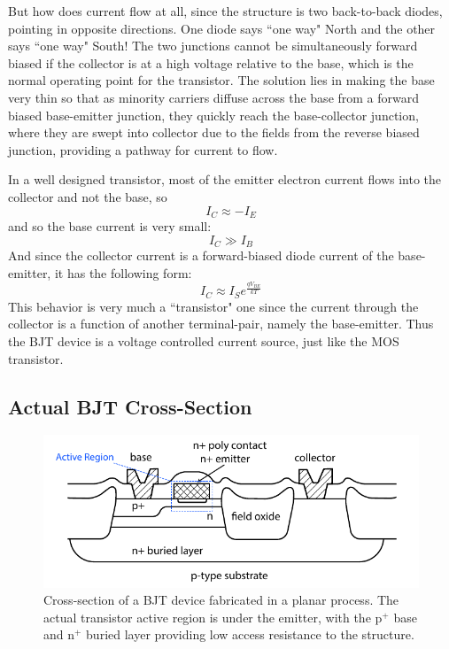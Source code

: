 But how does current flow at all, since the structure is two back-to-back diodes, pointing in opposite directions.  One diode says ``one way" North and the other says ``one way" South!  The two junctions cannot be simultaneously forward biased if the collector is at a high voltage relative to the base, which is the normal operating point for the transistor.  The solution lies in making the base very thin so that as minority carriers diffuse across the base from a forward biased base-emitter junction, they quickly reach the base-collector junction, where they are swept into collector due to the fields from the reverse biased junction, providing a pathway for current to flow.  

In a well designed transistor, most of the emitter electron current flows into the collector and not the base, so 
\begin{equation}
	{I_C} \approx  - {I_E}
\end{equation}
and so the base current is very small:
\begin{equation}
	{I_C} \gg {I_B}
\end{equation}
And since the collector current is a forward-biased diode current of the base-emitter, it has the following form:
\begin{equation}
	{I_C} \approx {I_S}{e^{\frac{{q{V_{BE}}}}{{kT}}}}
\end{equation}
This behavior is very much a ``transistor" one since the current through the collector is a function of another terminal-pair, namely the base-emitter.  Thus the BJT device is a voltage controlled current source, just like the MOS transistor.
\subsection{Actual BJT Cross-Section}
\begin{figure}[tb]
\begin{center}
\includegraphics[width=.75\columnwidth]{slide3_bjtcross}
\end{center}
\caption{Cross-section of a BJT device fabricated in a planar process.  The actual transistor active region is under the emitter, with the p$^+$ base and n$^+$ buried layer providing low access resistance to the structure.}
\label{fig:slide3_bjtcross}
\end{figure}

